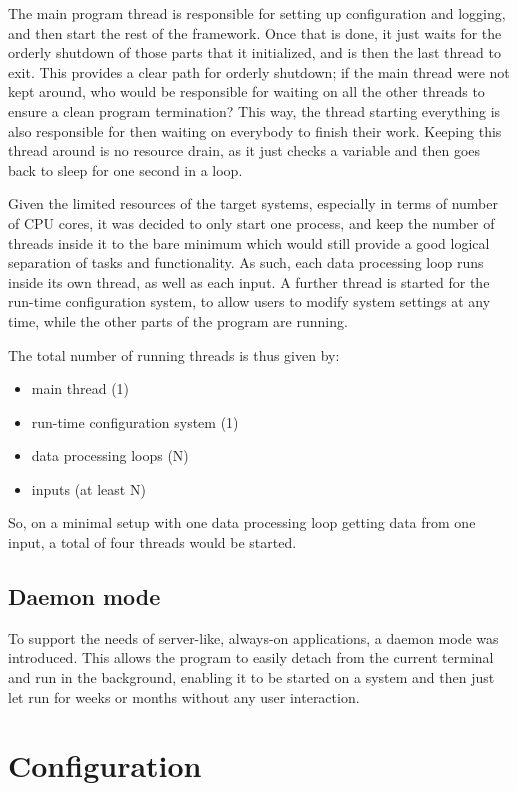 \documentclass[a4paper,12pt]{report}
\begin{document}
The main program thread is responsible for setting up configuration and logging, and then start the rest of the framework. Once that is done, it just waits for the orderly shutdown of those parts that it initialized, and is then the last thread to exit.
This provides a clear path for orderly shutdown; if the main thread were not kept around, who would be responsible for waiting on all the other threads to ensure a clean program termination? This way, the thread starting everything is also responsible for then waiting on everybody to finish their work.
Keeping this thread around is no resource drain, as it just checks a variable and then goes back to sleep for one second in a loop.

Given the limited resources of the target systems, especially in terms of number of CPU cores, it was decided to only start one process, and keep the number of threads inside it to the bare minimum which would still provide a good logical separation of tasks and functionality.
As such, each data processing loop runs inside its own thread, as well as each input.
A further thread is started for the run-time configuration system, to allow users to modify system settings at any time, while the other parts of the program are running.

The total number of running threads is thus given by:
\begin{itemize}
\item main thread (1)
\item run-time configuration system (1)
\item data processing loops (N)
\item inputs (at least N)
\end{itemize}
So, on a minimal setup with one data processing loop getting data from one input, a total of four threads would be started.

\subsection{Daemon mode} \label{subsec:daemon_mode}

To support the needs of server-like, always-on applications, a daemon mode was introduced. This allows the program to easily detach from the current terminal and run in the background, enabling it to be started on a system and then just let run for weeks or months without any user interaction.

\section{Configuration} \label{sec:configuration_A}
\end{document}
